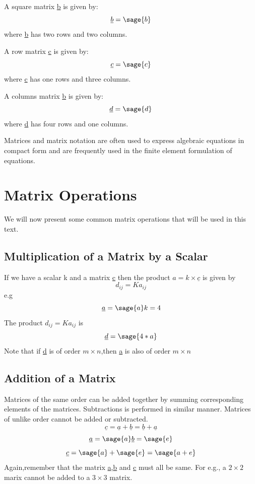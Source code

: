 \documentclass[12pt]{report}
\begin{document}
A square matrix \underline{b} is given by:
\begin{equation}
\underline{b}=\sage{b}
\label{eq:square}
\end{equation}
where \underline{b} has two rows and two columns.

A row matrix \underline{c} is given by:
\begin{equation}
\underline{c}=\sage{c}
\label{eq:row}
\end{equation}
where \underline{c} has one rows and three columns.

A columns matrix \underline{b} is given by:
\begin{equation}\underline{d}=\sage{d}
\label{eq:col}
\end{equation}
where \underline{d} has four rows and one columns.

Matrices and matrix notation are often used to express algebraic equations in compact form and are frequently used in the finite element formulation of equations.
\section{Matrix Operations}
We will now present some common matrix operations that will be used in this text.
\subsection{Multiplication of a Matrix by a Scalar}
If we have a scalar k and a matrix \underline{c} then the product $a = k \times \underline{c} $ is given by
\begin{equation}d_{{ij}} = Ka_{{ij}} \label{eq:element}
\end{equation}
e.g
$$\underline{a}=\sage{a}
k= 4 $$
The product $d_{{ij}} = Ka_{{ij}}$ is 
$$\underline{d} = \sage{4*a}$$
Note that if \underline{d} is of order $ m \times n $,then \underline{a} is also of order $ m \times n $
\subsection{Addition of a Matrix}
Matrices of the same order can be added together by summing corresponding elements of the matrices. Subtractions is performed in similar manner. Matrices of unlike order cannot be added or subtracted.
\begin{equation}\underline{c}=\underline{a}+\underline{b}= \underline{b}+\underline{a} \end{equation}
$$\underline{a}=\sage{a}
\underline{b}=\sage{e}$$
$$\underline{c}=\sage{a} + \sage{e}=\sage{a+e}$$
Again,remember that the matrix \underline{a},\underline{b} and \underline{c} must all be same. For e.g., a $ 2 \times 2 $ marix cannot be added to a $ 3 \times 3 $ matrix.
\end{document}
